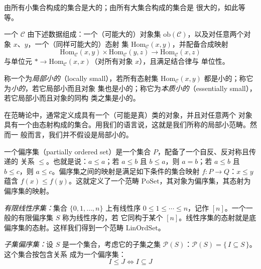 \begin{example*}
由所有小集合构成的集合是大的；由所有大集合构成的集合是
很大的，如此等等。
\end{example*}

\begin{definition}\label{def:category}
一个\trCategory{} $\mathcal{C}$ 由下述数据组成：一个（可能大的）对象集
$\mathrm{ob}(\mathcal{C})$，以及对任意两个对象 $x$、$y$，一个（同样可能大的）态射
集 $\mathrm{Hom}_{\mathcal{C}}(x,y)$，并配备合成映射
\[
\mathrm{Hom}_{\mathcal{C}}(x,y) \times \mathrm{Hom}_{\mathcal{C}}(y,z) \to
\mathrm{Hom}_{\mathcal{C}}(x,z)
\]
与单位元 $* \to \mathrm{Hom}_{\mathcal{C}}(x,x)$（对所有对象 $x$），且满足结合律与
单位性。

称一个\trCategory{}为\emph{局部小的}（locally small），若所有态射集
$\mathrm{Hom}_{\mathcal{C}}(x,y)$ 都是小的；称它为\emph{小的}，若它局部小而且对象
集也是小的；称它为\emph{本质小的}（essentially small），若它局部小而且对象的同构
类之集是小的。
\end{definition}

\begin{remark}\label{rem:locally-small}
在范畴论中，\trCategory{}通常定义成具有一个（可能是真）类的对象，并且对任意两个
对象具有一个由态射构成的集合。用我们的语言说，这就是我们所称的局部小范畴。然而一
般而言，我们并不假设\trCategory{}是局部小的。
\end{remark}

\begin{definition}\label{def:poset}
一个偏序集（partially ordered set）是一个集合 $P$，配备了一个自反、反对称且传递的
关系 $\le$。也就是说：$a \le a$；若 $a \le b$ 且 $b \le a$，则 $a = b$；若
$a \le b$ 且 $b \le c$，则 $a \le c$。偏序集之间的映射是满足如下条件的集合映射
$f\colon P \to Q$：$x \le y$ 蕴含 $f(x) \le f(y)$。这就定义了一个范畴
$\mathrm{PoSet}$，其对象为偏序集，其态射为偏序集的映射。
\end{definition}

\begin{example*}
\emph{有限线性序集：}集合 $\{0,1,\dots,n\}$ 上有线性序
$0 \le 1 \le \dotsb \le n$，记作 $[n]$。一个一般的有限偏序集 $S$ 称为线性序的，若
它同构于某个 $[n]$。线性序集的态射就是底偏序集的态射。这样我们得到一个范畴
$\mathrm{LinOrdSet}$。
\end{example*}

\begin{example*}
\emph{子集偏序集：}设 $S$ 是一个集合，考虑它的子集之集
$\mathcal{P}(S)$：$\mathcal{P}(S) = \{\, I \subseteq S \,\}$。这个集合按包含关系
成为一个偏序集：
\[
I \le J \iff I \subseteq J
\]
\end{example*}

